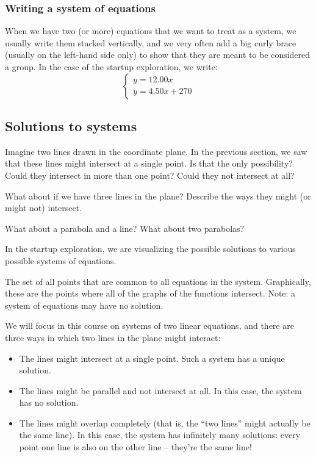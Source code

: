 \subsubsection{Writing a system of equations}

When we have two (or more) equations that we want to treat as a system, we usually write them stacked vertically, and we very often add a big curly brace (usually on the left-hand side only) to show that they are meant to be considered a group. In the case of the startup exploration, we write: \[\left\{\begin{array}{l}y=12.00x\\y=4.50x+270\end{array}\right.\]

\subsection{Solutions to systems}

\begin{boxexplore}
Imagine two lines drawn in the coordinate plane. In the previous section, we saw that these lines might intersect at a single point. Is that the only possibility? Could they intersect in more than one point? Could they not intersect at all?

What about if we have three lines in the plane? Describe the ways they might (or might not) intersect.

What about a parabola and a line? What about two parabolas?
\end{boxexplore}


In the startup exploration, we are visualizing the possible solutions to various possible systems of equations.

\begin{boxdef}
The set of all points that are common to all equations in the system. Graphically, these are the points where all of the graphs of the functions intersect. Note: a system of equations may have no solution.
\end{boxdef}

We will focus in this course on systems of two linear equations, and there are three ways in which two lines in the plane might interact:
\begin{itemize}
\item The lines might intersect at a single point. Such a system has a unique solution.

\item The lines might be parallel and not intersect at all. In this case, the system has no solution.

\item The lines might overlap completely (that is, the ``two lines'' might actually be the same line). In this case, the system has infinitely many solutions: every point one line is also on the other line -- they're the same line!
\end{itemize}

